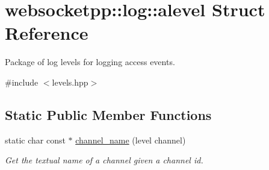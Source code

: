 \hypertarget{structwebsocketpp_1_1log_1_1alevel}{}\section{websocketpp\+:\+:log\+:\+:alevel Struct Reference}
\label{structwebsocketpp_1_1log_1_1alevel}


Package of log levels for logging access events.  




{\ttfamily \#include $<$levels.\+hpp$>$}

\subsection*{Static Public Member Functions}
\begin{DoxyCompactItemize}
\item 
static char const  $\ast$ \hyperlink{structwebsocketpp_1_1log_1_1alevel_a7145c18f40f74cff4946994c14634ce9}{channel\+\_\+name} (level channel)
\begin{DoxyCompactList}\small\item\em Get the textual name of a channel given a channel id. \end{DoxyCompactList}\end{DoxyCompactItemize}
